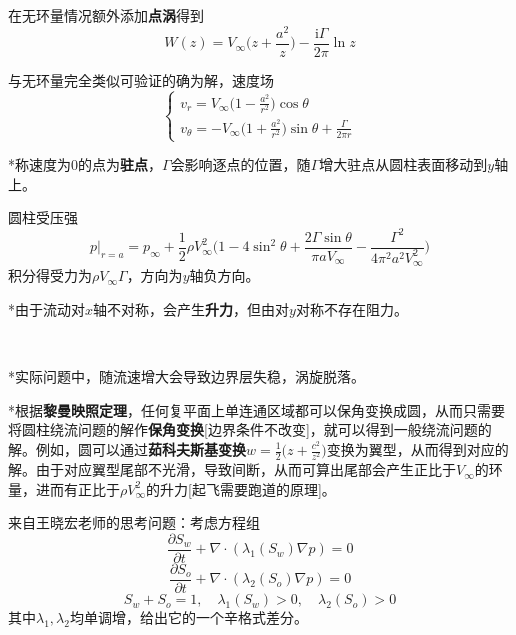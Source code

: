 \documentclass[a4paper,UTF8,fontset=windows]{ctexart}
\begin{document}
在无环量情况额外添加\textbf{点涡}得到
$$W(z)=V_\infty\bigg(z+\frac{a^2}{z}\bigg)-\frac{\mathrm{i}\Gamma}{2\pi}\ln z$$

与无环量完全类似可验证的确为解，速度场
$$\begin{cases}v_r=V_\infty\big(1-\frac{a^2}{r^2}\big)\cos\theta\\v_\theta=-V_\infty\big(1+\frac{a^2}{r^2}\big)\sin\theta+\frac{\Gamma}{2\pi r}\end{cases}$$

*称速度为0的点为\textbf{驻点}，$\Gamma$会影响逐点的位置，随$\Gamma$增大驻点从圆柱表面移动到$y$轴上。

圆柱受压强
$$p|_{r=a}=p_\infty+\frac{1}{2}\rho V_\infty^2\bigg(1-4\sin^2\theta+\frac{2\Gamma\sin\theta}{\pi aV_\infty}-\frac{\Gamma^2}{4\pi^2a^2V_\infty^2}\bigg)$$
积分得受力为$\rho V_\infty\Gamma$，方向为$y$轴负方向。

*由于流动对$x$轴不对称，会产生\textbf{升力}，但由对$y$对称不存在阻力。

\

*实际问题中，随流速增大会导致边界层失稳，涡旋脱落。

*根据\textbf{黎曼映照定理}，任何复平面上单连通区域都可以保角变换成圆，从而只需要将圆柱绕流问题的解作\textbf{保角变换}[边界条件不改变]，就可以得到一般绕流问题的解。例如，圆可以通过\textbf{茹科夫斯基变换}$w=\frac{1}{2}\big(z+\frac{c^2}{z^2}\big)$变换为翼型，从而得到对应的解。由于对应翼型尾部不光滑，导致间断，从而可算出尾部会产生正比于$V_\infty$的环量，进而有正比于$\rho V_\infty^2$的升力[起飞需要跑道的原理]。

\newpage

来自王晓宏老师的思考问题：考虑方程组
$$\frac{\partial S_w}{\partial t}+\nabla\cdot(\lambda_1(S_w)\nabla p)=0$$
$$\frac{\partial S_o}{\partial t}+\nabla\cdot(\lambda_2(S_o)\nabla p)=0$$
$$S_w+S_o=1,\quad\lambda_1(S_w)>0,\quad\lambda_2(S_o)>0$$
其中$\lambda_1,\lambda_2$均单调增，给出它的一个辛格式差分。
\end{document}
